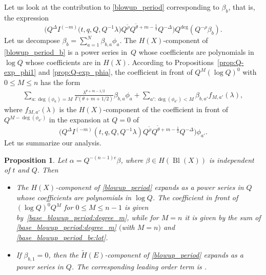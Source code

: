 \documentclass[10pt,a4paper]{article}
\numberwithin{equation}{section}
\newtheorem{Proposition}[Theorem]{Proposition}
\newcommand{\leftexp}[2]{{\vphantom{#2}}^{#1}{#2}}
\begin{document}
Let us look at the contribution to \eqref{blowup_period} corresponding to $\beta_b$, that is, the expression
\begin{equation}\label{blowup_period_b}
\big(Q^\Delta I^{(-m)}\big(t,q,Q,Q^{-1}\lambda\big)Q^{\widetilde\rho}Q^{\widetilde\theta+m-\frac{1}{2}}Q^{-\Delta}\big)
 Q^{\operatorname{deg}} (Q^{-\rho} \beta_b).
\end{equation}
Let us decompose $\beta_b=\sum_{a=1}^N \beta_{b,a} \phi_a$. The $H(X)$-component of \eqref{blowup_period_b} is a power series in~$Q$ whose coefficients are polynomials in $\log Q$ whose coefficients are in $H(X)$. According to Propositions~\eqref{prop:Q-exp_phi1} and
\eqref{prop:Q-exp_phia}, the coefficient in front of $Q^M (\log Q)^0$ with $0\leq M\leq n$ has the form
\begin{gather}\label{base_blowup_period:degree_m}
\sum_{a\colon \operatorname{deg}(\phi_a)=M}
\frac{\lambda^{\theta+m-1/2}}{\Gamma(\theta+m+1/2)} \beta_{b,a}\phi_a +
\sum_{a'\colon \operatorname{deg}(\phi_{a'})<M} \beta_{b,a'} f_{M,a'}(\lambda),
\end{gather}
where $f_{M,a'}(\lambda)$ is the $H(X)$-component of the coefficient in front of $Q^{M-\operatorname{deg}(\phi_{a'})}$ in the expansion at $Q=0$ of
\[
\big(Q^\Delta I^{(-m)}\left(t,q,Q,Q^{-1}\lambda\right)Q^{\widetilde\rho}Q^{\widetilde\theta+m-\frac{1}{2}}Q^{-\Delta}\big)
 \phi_{a'}.
\]
Let us summarize our analysis.
\begin{Proposition}\label{prop:blowup_period_Qexp}
Let $\alpha=Q^{-(n-1)e}\beta$, where $\beta\in H(\operatorname{Bl}(X))$ is independent of $t$ and $Q$. Then
\begin{itemize}\itemsep=0pt
\item[$(a)$] The $H(X)$-component of \eqref{blowup_period} expands as a power series in $Q$ whose coefficients are polynomials in $\log Q$. The coefficient in front of $(\log Q)^0 Q^M$ for $0\leq M\leq n-1$ is given by~\eqref{base_blowup_period:degree_m}, while for $M=n$ it is given by the sum of \eqref{base_blowup_period:degree_m} $($with $M=n)$ and \eqref{base_blowup_period_be:lot}.
\item[$(b)$] If $\beta_{b,1}=0$, then the $\widetilde{H}(E)$-component of \eqref{blowup_period} expands as a power series in $Q$. The corresponding leading order term is \smash{$\leftexp{tw}{I}_{\beta_e}^{(-m)}(1,\lambda)$}.
\end{itemize}
\end{Proposition}
\end{document}
